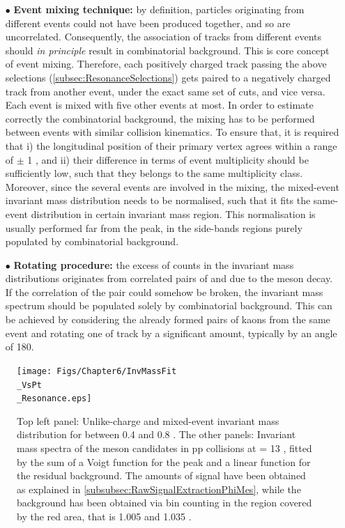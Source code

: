 \begin{itemize}
\item[$\bullet$] \textbf{Event mixing technique:} by definition, particles originating from different events could not have been produced together, and so are uncorrelated. Consequently, the association of tracks from different events should \textit{in principle} result in combinatorial background. This is core concept of event mixing.
Therefore, each positively charged track passing the above selections (\Sec\ref{subsec:ResonanceSelections}) gets paired to a negatively charged track from another event, under the exact same set of cuts, and vice versa. Each event is mixed with five other events at most.
In order to estimate correctly the combinatorial background, the mixing has to be performed between events with similar collision kinematics. To ensure that, it is required that i) the longitudinal position of their primary vertex agrees within a range of $\pm$ 1 \cm, and ii) their difference in terms of event multiplicity should be sufficiently low, such that they belongs to the same multiplicity class. Moreover, since the several events are involved in the mixing, the mixed-event invariant mass distribution needs to be normalised, such that it fits the same-event distribution in certain invariant mass region. This normalisation is usually performed far from the peak, in the side-bands regions purely populated by combinatorial background.
\item[$\bullet$] \textbf{Rotating procedure:} the excess of counts in the invariant mass distributions originates from correlated pairs of \rmKplus and \rmKminus due to the \rmPhiMes meson decay. If the correlation of the pair could somehow be broken, the invariant mass spectrum should be populated solely by combinatorial background. This can be achieved by considering the already formed pairs of kaons from the same event and rotating one of track by a significant amount, typically by an angle of 180\textdegree. 
\end{itemize}

\begin{figure}[t]
	\hspace{-2.cm}
	\texttt{[image: Figs/Chapter6/InvMassFit\\\_VsPt\\\_Resonance.eps]}
\caption{Top left panel: Unlike-charge and mixed-event invariant mass distribution for \pT between 0.4 and 0.8 \gmom. The other panels: Invariant mass spectra of the \rmPhiMes meson candidates in pp collisions at \sqrtS = 13 \tev, fitted by the sum of a Voigt function for the peak and a linear function for the residual background. The amounts of signal have been obtained as explained in \Sec\ref{subsubsec:RawSignalExtractionPhiMes}, while the background has been obtained via bin counting in the region covered by the red area, that is 1.005 and 1.035 \gmass.}
	\label{fig:InvMassPhiResVsPt}
\end{figure}


